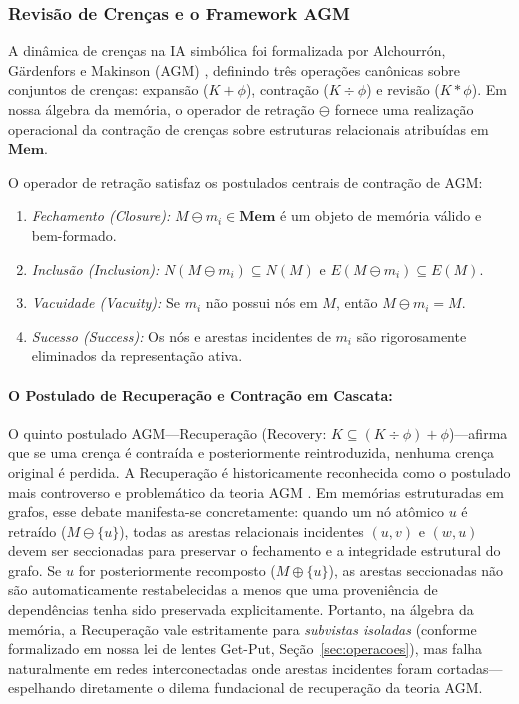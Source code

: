 \documentclass[11pt,a4paper]{article}
\theoremstyle{definition}
\begin{document}
\subsubsection{Revis\~ao de Cren\c{c}as e o Framework AGM}
A din\^amica de cren\c{c}as na IA simb\'olica foi formalizada por Alchourr{\'o}n, G{\"a}rdenfors e Makinson (AGM) \cite{alchourron1985logic}, definindo tr\^es opera\c{c}\~oes can\^onicas sobre conjuntos de cren\c{c}as: expans\~ao ($K + \phi$), contra\c{c}\~ao ($K \div \phi$) e revis\~ao ($K * \phi$). Em nossa \'algebra da mem\'oria, o operador de retra\c{c}\~ao $\ominus$ fornece uma realiza\c{c}\~ao operacional da contra\c{c}\~ao de cren\c{c}as sobre estruturas relacionais atribu\'idas em $\mathbf{Mem}$.

O operador de retra\c{c}\~ao satisfaz os postulados centrais de contra\c{c}\~ao de AGM:
\begin{enumerate}
    \item \emph{Fechamento (Closure):} $M \ominus m_i \in \mathbf{Mem}$ \'e um objeto de mem\'oria v\'alido e bem-formado.
    \item \emph{Inclus\~ao (Inclusion):} $N(M \ominus m_i) \subseteq N(M)$ e $E(M \ominus m_i) \subseteq E(M)$.
    \item \emph{Vacuidade (Vacuity):} Se $m_i$ n\~ao possui n\'os em $M$, ent\~ao $M \ominus m_i = M$.
    \item \emph{Sucesso (Success):} Os n\'os e arestas incidentes de $m_i$ s\~ao rigorosamente eliminados da representa\c{c}\~ao ativa.
\end{enumerate}

\paragraph{O Postulado de Recupera\c{c}\~ao e Contra\c{c}\~ao em Cascata:}
O quinto postulado AGM---Recupera\c{c}\~ao (Recovery: $K \subseteq (K \div \phi) + \phi$)---afirma que se uma cren\c{c}a \'e contra\'ida e posteriormente reintroduzida, nenhuma cren\c{c}a original \'e perdida. A Recupera\c{c}\~ao \'e historicamente reconhecida como o postulado mais controverso e problem\'atico da teoria AGM \cite{makinson1987status,hansson1999textbook}. Em mem\'orias estruturadas em grafos, esse debate manifesta-se concretamente: quando um n\'o at\^omico $u$ \'e retra\'ido ($M \ominus \{u\}$), todas as arestas relacionais incidentes $(u, v)$ e $(w, u)$ devem ser seccionadas para preservar o fechamento e a integridade estrutural do grafo. Se $u$ for posteriormente recomposto ($M \oplus \{u\}$), as arestas seccionadas n\~ao s\~ao automaticamente restabelecidas a menos que uma proveni\^encia de depend\^encias tenha sido preservada explicitamente. Portanto, na \'algebra da mem\'oria, a Recupera\c{c}\~ao vale estritamente para \emph{subvistas isoladas} (conforme formalizado em nossa lei de lentes Get-Put, Se\c{c}\~ao~\ref{sec:operacoes}), mas falha naturalmente em redes interconectadas onde arestas incidentes foram cortadas---espelhando diretamente o dilema fundacional de recupera\c{c}\~ao da teoria AGM.
\end{document}
